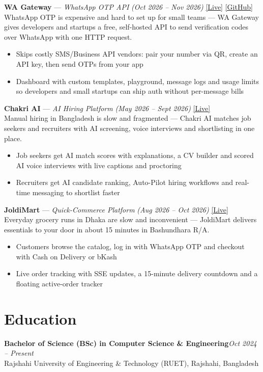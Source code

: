 \documentclass[11pt,a4paper]{article}
\newcommand{\rlink}[2]{\href{#1}{\textcolor{linkblue}{#2}}}
\begin{document}
\vspace{7pt}
\noindent
\textbf{WA Gateway} --- \textit{WhatsApp OTP API} \textit{(Oct 2026 -- Nov 2026)}\hfill
\rlink{https://wa.ars2k03.tech}{[Live]}
\rlink{https://github.com/ars2k03/wa}{[GitHub]}\\
WhatsApp OTP is expensive and hard to set up for small teams --- WA Gateway gives developers and startups a free, self-hosted API to send verification codes over WhatsApp with one HTTP request.
\begin{itemize}
  \item Skips costly SMS/Business API vendors: pair your number via QR, create an API key, then send OTPs from your app
  \item Dashboard with custom templates, playground, message logs and usage limits so developers and small startups can ship auth without per-message bills
\end{itemize}

\vspace{7pt}
\noindent
\textbf{Chakri AI} --- \textit{AI Hiring Platform} \textit{(May 2026 -- Sept 2026)}\hfill
\rlink{https://chakriai.com}{[Live]}\\
Manual hiring in Bangladesh is slow and fragmented --- Chakri AI matches job seekers and recruiters with AI screening, voice interviews and shortlisting in one place.
\begin{itemize}
  \item Job seekers get AI match scores with explanations, a CV builder and scored AI voice interviews with live captions and proctoring
  \item Recruiters get AI candidate ranking, Auto-Pilot hiring workflows and real-time messaging to shortlist faster
\end{itemize}

\vspace{7pt}
\noindent
\textbf{JoldiMart} --- \textit{Quick-Commerce Platform} \textit{(Aug 2026 -- Oct 2026)}\hfill
\rlink{https://joldimart.com}{[Live]}\\
Everyday grocery runs in Dhaka are slow and inconvenient --- JoldiMart delivers essentials to your door in about 15 minutes in Bashundhara R/A.
\begin{itemize}
  \item Customers browse the catalog, log in with WhatsApp OTP and checkout with Cash on Delivery or bKash
  \item Live order tracking with SSE updates, a 15-minute delivery countdown and a floating active-order tracker
\end{itemize}

\section{Education}
\textbf{Bachelor of Science (BSc) in Computer Science \& Engineering}\hfill\textit{Oct 2024 -- Present}\\
Rajshahi University of Engineering \& Technology (RUET), Rajshahi, Bangladesh
\end{document}
